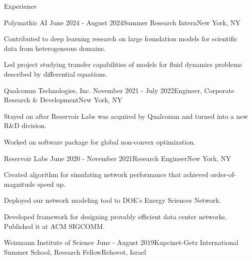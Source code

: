 \documentclass{resume} %
\begin{document}
\begin{rSection}{Experience}

\begin{rSubsection}{Polymathic AI} {June 2024 - August 2024}{Summer Research Intern}{New York, NY}

\item Contributed to deep learning research on large foundation models for scientific data from heterogeneous domains.
\item Led project studying transfer capabilities of models for fluid dynamics problems described by differential equations.

\end{rSubsection}  
    

\begin{rSubsection}{Qualcomm Technologies, Inc.} {November 2021 - July 2022}{Engineer, Corporate Research \& Development}{New York, NY}

\item Stayed on after Reservoir Labs was acquired by Qualcomm and turned into a new R\&D division.
\item Worked on software package for global non-convex optimization.
 
\end{rSubsection}  


\begin{rSubsection}{Reservoir Labs} {June 2020 - November 2021}{Research Engineer}{New York, NY}

\item Created algorithm for simulating network performance that achieved order-of-magnitude speed up.
\item Deployed our network modeling tool to DOE’s Energy Sciences Network.
\item Developed framework for designing provably efficient data center networks. Published it at ACM SIGCOMM.
 
\end{rSubsection}  


\begin{rSubsection}{Weizmann Institute of Science} {June - August 2019}{Kupcinet-Getz International Summer School, Research Fellow}{Rehovot, Israel}


\end{rSubsection}
\end{rSection}
\end{document}
